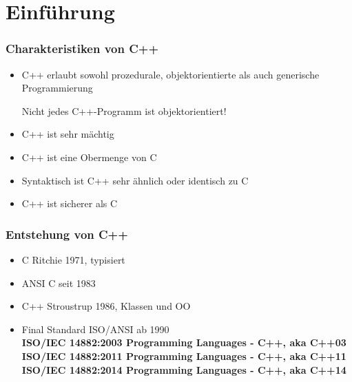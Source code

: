 
\part{Einführung}

\section{Charakteristiken von C++}
\begin{itemize}
	\item C++ erlaubt sowohl prozedurale, objektorientierte als auch generische Programmierung\\
	\begin{achtung}
		Nicht jedes C++-Programm ist objektorientiert!
	\end{achtung}
	\item C++ ist sehr mächtig
	\item C++ ist eine Obermenge von C
	\item Syntaktisch ist C++ sehr ähnlich oder identisch zu C
	\item C++ ist sicherer als C
\end{itemize}

\section{Entstehung von C++}
\begin{itemize}
	\item C Ritchie 1971, typisiert
	\item ANSI C seit 1983
	\item C++ Stroustrup 1986, Klassen und OO
	\item Final Standard ISO/ANSI 	ab 1990 
	\vspace{3mm}
	\\ \textbf{ISO/IEC 14882:2003 Programming Languages - C++, aka C++03} 			
	\vspace{3mm}
	\\ \textbf{ISO/IEC 14882:2011 Programming Languages - C++, aka C++11}
	\vspace{3mm}
	\\ \textbf{ISO/IEC 14882:2014 Programming Languages - C++, aka C++14}
\end{itemize}

